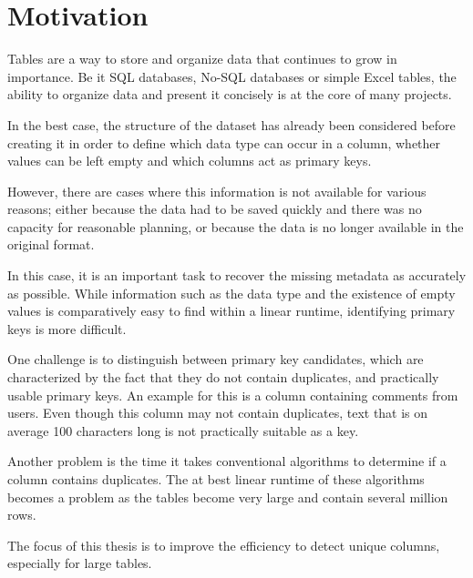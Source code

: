 \chapter{Motivation}
Tables are a way to store and organize data that continues to grow in importance. Be it SQL databases, No-SQL databases or simple Excel tables, the ability to organize data and present it concisely is at the core of many projects.

In the best case, the structure of the dataset has already been considered before creating it in order to define which data type can occur in a column, whether values can be left empty and which columns act as primary keys.

However, there are cases where this information is not available for various reasons; either because the data had to be saved quickly and there was no capacity for reasonable planning, or because the data is no longer available in the original format. %

In this case, it is an important task to recover the missing metadata as accurately as possible. While information such as the data type and the existence of empty values is comparatively easy to find within a linear runtime, identifying primary keys is more difficult.

One challenge is to distinguish between primary key candidates, which are characterized by the fact that they do not contain duplicates, and practically usable primary keys. An example for this is a column containing comments from users. Even though this column may not contain duplicates, text that is on average 100 characters long is not practically suitable as a key.

Another problem is the time it takes conventional algorithms to determine if a column contains duplicates. The at best linear runtime of these algorithms becomes a problem as the tables become very large and contain several million rows.

The focus of this thesis is to improve the efficiency to detect unique columns, especially for large tables.
